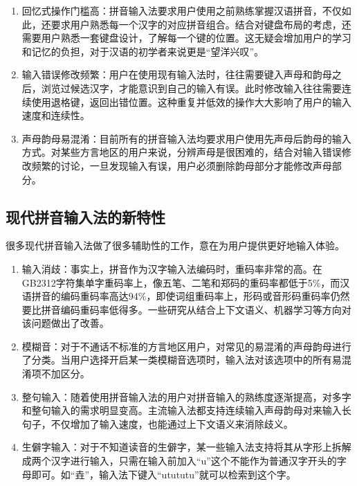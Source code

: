 \begin{enumerate}
  \item
  回忆式操作门槛高：拼音输入法要求用户使用之前熟练掌握汉语拼音，不仅如此，还要求用户熟悉每一个汉字的对应拼音组合。结合对键盘布局的考虑，还需要用户熟悉一套键盘设计，了解每一个键的位置。这无疑会增加用户的学习和记忆的负担，对于汉语的初学者来说更是“望洋兴叹”。

  \item
  输入错误修改频繁：用户在使用现有输入法时，往往需要键入声母和韵母之后，浏览过候选汉字，才能意识到自己的输入有误。此时修改输入往往需要连续使用退格键，返回出错位置。这种重复并低效的操作大大影响了用户的输入速度和连续性。

  \item
  声母韵母易混淆：目前所有的拼音输入法均要求用户使用先声母后韵母的输入方式。对某些方言地区的用户来说，分辨声母是很困难的，结合对输入错误修改频繁的讨论，一旦发现输入有误，用户必须删除韵母部分才能修改声母部分。
  \end{enumerate}

  \subsection{现代拼音输入法的新特性\label{sec:new_feature}}

  很多现代拼音输入法做了很多辅助性的工作，意在为用户提供更好地输入体验。

  \begin{enumerate}

  \item
  输入消歧：事实上，拼音作为汉字输入法编码时，重码率非常的高。在GB2312字符集单字重码率上，像五笔、二笔和郑码的重码率都低于5\%，而汉语拼音的编码重码率高达94\%，即使词组重码率上，形码或音形码重码率仍然要比拼音编码重码率低得多。一些研究从结合上下文语义、机器学习等方向对该问题做出了改善。\supercite{wen2008ambiguity, liu2002approach}

  \item
  模糊音：对于不通话不标准的方言地区用户，对常见的易混淆的声母韵母进行了分类。当用户选择开启某一类模糊音选项时，输入法对该选项中的所有易混淆项不加区分。

  \item
  整句输入：随着使用拼音输入法的用户对拼音输入的熟练度逐渐提高，对多字和整句输入的需求明显变高。主流输入法都支持连续输入声母韵母对来输入长句子，不仅增加了输入速度，也能通过上下文语义来消除歧义。

  \item
  生僻字输入：对于不知道读音的生僻字，某一些输入法支持将其从字形上拆解成两个汉字进行输入，只需在输入前加入“u”这个不能作为普通汉字开头的字母即可。如“垚”，输入法下键入“utututu”就可以检索到这个字。
  \end{enumerate}
